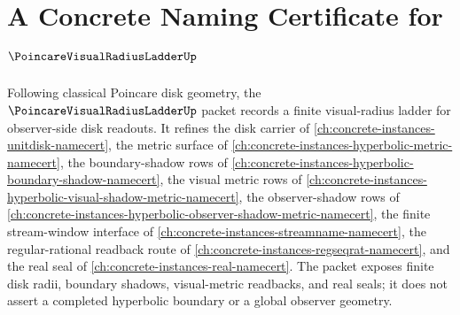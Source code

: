 \chapter{A Concrete Naming Certificate for $\PoincareVisualRadiusLadderUp$}
\label{ch:concrete-instances-poincare-visual-radius-ladder-namecert}

Following classical Poincare disk geometry, the $\PoincareVisualRadiusLadderUp$ packet records a finite visual-radius ladder for observer-side disk readouts. It refines the disk carrier of \autoref{ch:concrete-instances-unitdisk-namecert}, the metric surface of \autoref{ch:concrete-instances-hyperbolic-metric-namecert}, the boundary-shadow rows of \autoref{ch:concrete-instances-hyperbolic-boundary-shadow-namecert}, the visual metric rows of \autoref{ch:concrete-instances-hyperbolic-visual-shadow-metric-namecert}, the observer-shadow rows of \autoref{ch:concrete-instances-hyperbolic-observer-shadow-metric-namecert}, the finite stream-window interface of \autoref{ch:concrete-instances-streamname-namecert}, the regular-rational readback route of \autoref{ch:concrete-instances-regseqrat-namecert}, and the real seal of \autoref{ch:concrete-instances-real-namecert}. The packet exposes finite disk radii, boundary shadows, visual-metric readbacks, and real seals; it does not assert a completed hyperbolic boundary or a global observer geometry.

